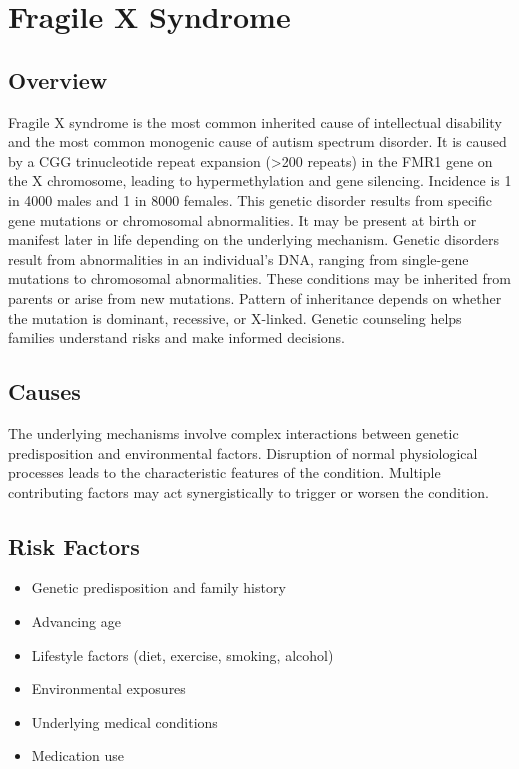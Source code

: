 \chapter{Fragile X Syndrome}
\label{sec:Fragile X Syndrome}

\section{Overview}
Fragile X syndrome is the most common inherited cause of intellectual disability and the most common monogenic cause of autism spectrum disorder. It is caused by a CGG trinucleotide repeat expansion (>200 repeats) in the FMR1 gene on the X chromosome, leading to hypermethylation and gene silencing. Incidence is 1 in 4000 males and 1 in 8000 females. This genetic disorder results from specific gene mutations or chromosomal abnormalities. It may be present at birth or manifest later in life depending on the underlying mechanism. Genetic disorders result from abnormalities in an individual's DNA, ranging from single-gene mutations to chromosomal abnormalities. These conditions may be inherited from parents or arise from new mutations. Pattern of inheritance depends on whether the mutation is dominant, recessive, or X-linked. Genetic counseling helps families understand risks and make informed decisions.
\section{Causes}
The underlying mechanisms involve complex interactions between genetic predisposition and environmental factors. Disruption of normal physiological processes leads to the characteristic features of the condition. Multiple contributing factors may act synergistically to trigger or worsen the condition.
\section{Risk Factors}


\begin{itemize}[noitemsep]
  \item Genetic predisposition and family history
  \item Advancing age
  \item Lifestyle factors (diet, exercise, smoking, alcohol)
  \item Environmental exposures
  \item Underlying medical conditions
  \item Medication use
\end{itemize}
